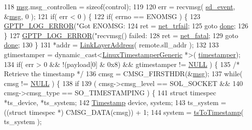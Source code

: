 \begin{DoxyCode}
118     \hyperlink{maap__log__linux_8c_a0c7e58a50354c4a4d6dad428d0e47029}{msg}.msg\_controllen = \textcolor{keyword}{sizeof}(control);
119 
120     err = recvmsg( \hyperlink{class_linux_network_interface_ab2e41169dafb40e1ab917422a2d1145a}{sd\_event}, &\hyperlink{maap__log__linux_8c_a0c7e58a50354c4a4d6dad428d0e47029}{msg}, 0 );
121     \textcolor{keywordflow}{if}( err < 0 ) \{
122         \textcolor{keywordflow}{if}( errno == ENOMSG ) \{
123             \hyperlink{gptp__log_8hpp_afefbb1009717c128012bfeed94842987}{GPTP\_LOG\_ERROR}(\textcolor{stringliteral}{"Got ENOMSG: %
124             ret = \hyperlink{avbts__osnet_8hpp_a21b2b4b5e479ef3adfc039ac30c961cda02bf20698d895d3c6a6db8926645d69b}{net\_trfail};
125             \textcolor{keywordflow}{goto} \hyperlink{mrp_validate_8c_a5992b274cfdcacdbc1fa8347fd01ebde}{done};
126         \}
127         \hyperlink{gptp__log_8hpp_afefbb1009717c128012bfeed94842987}{GPTP\_LOG\_ERROR}(\textcolor{stringliteral}{"recvmsg() failed: %
128         ret = \hyperlink{avbts__osnet_8hpp_a21b2b4b5e479ef3adfc039ac30c961cda2ab09e0547baba0a6c07a8d53e1529a5}{net\_fatal};
129         \textcolor{keywordflow}{goto} \hyperlink{mrp_validate_8c_a5992b274cfdcacdbc1fa8347fd01ebde}{done};
130     \}
131     *addr = \hyperlink{class_link_layer_address}{LinkLayerAddress}( remote.sll\_addr );
132 
133     gtimestamper = \textcolor{keyword}{dynamic\_cast<}\hyperlink{class_linux_timestamper_generic}{LinuxTimestamperGeneric} *\textcolor{keyword}{>}(
      \hyperlink{class_linux_network_interface_a47975f2b80d6d5e6fc426813df74feeb}{timestamper});
134     \textcolor{keywordflow}{if}( err > 0 && !(payload[0] & 0x8) && gtimestamper != \hyperlink{openavb__types__base__pub_8h_a070d2ce7b6bb7e5c05602aa8c308d0c4}{NULL} ) \{
135         \textcolor{comment}{/* Retrieve the timestamp */}
136         cmsg = CMSG\_FIRSTHDR(&\hyperlink{maap__log__linux_8c_a0c7e58a50354c4a4d6dad428d0e47029}{msg});
137         \textcolor{keywordflow}{while}( cmsg != \hyperlink{openavb__types__base__pub_8h_a070d2ce7b6bb7e5c05602aa8c308d0c4}{NULL} ) \{
138             \textcolor{keywordflow}{if}
139                 ( cmsg->cmsg\_level == SOL\_SOCKET &&
140                   cmsg->cmsg\_type == SO\_TIMESTAMPING ) \{
141                 \textcolor{keyword}{struct }timespec *ts\_device, *ts\_system;
142                 \hyperlink{class_timestamp}{Timestamp} device, system;
143                 ts\_system = ((\textcolor{keyword}{struct }timespec *) CMSG\_DATA(cmsg)) + 1;
144                 system = \hyperlink{linux__hal__common_8cpp_aca59dd57dc39771609459e65457e0740}{tsToTimestamp}( ts\_system );
}}
\end{DoxyCode}

